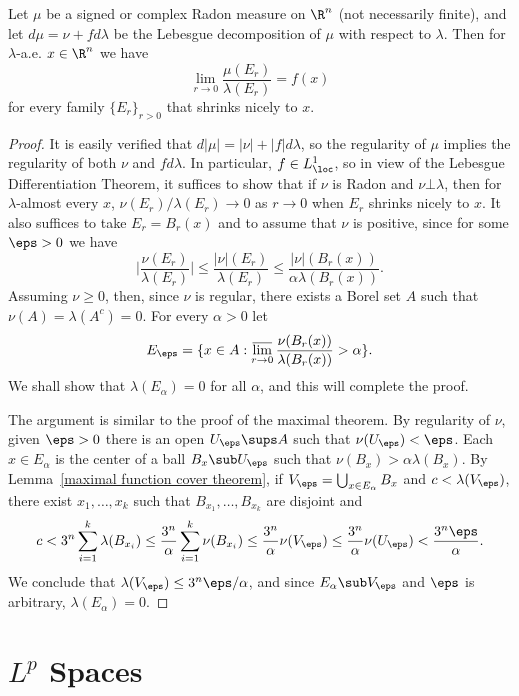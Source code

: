 \begin{theorem}
Let $\mu$ be a signed or complex Radon measure on $\R^n$ (not necessarily finite), and let $d\mu=\nu+fd\lambda$ be the Lebesgue decomposition of $\mu$ with respect to $\lambda$. Then for $\lambda$-a.e. $x\in\R^n$ we have
\[\lim_{r\to 0}\frac{\mu(E_r)}{\lambda(E_r)}=f(x)\]
for every family $\{E_r\}_{r>0}$ that shrinks nicely to $x$.
\end{theorem}
\begin{proof}
It is easily verified that $d|\mu|=|\nu|+|f|d\lambda$, so the regularity of $\mu$ implies the regularity of both $\nu$ and $fd\lambda$. In particular, $f\in L^1_{\loc}$, so in view of the Lebesgue Differentiation Theorem, it suffices to show that if $\nu$ is Radon and $\nu\bot\lambda$, then for $\lambda$-almost every $x$, $\nu(E_r)/\lambda(E_r)\to 0$ as $r\to 0$ when $E_r$ shrinks nicely to $x$. It also suffices to take $E_r=B_r(x)$ and to assume that $\nu$ is positive, since for some $\eps>0$ we have
\[\Big|\frac{\nu(E_r)}{\lambda(E_r)}\Big|\leq\frac{|\nu|(E_r)}{\lambda(E_r)}\leq\frac{|\nu|(B_r(x))}{\alpha\lambda(B_r(x))}.\]
Assuming $\nu\geq 0$, then, since $\nu$ is regular, there exists a Borel set $A$ such that $\nu(A)=\lambda(A^c)=0$. For every $\alpha>0$ let
\[E_\eps=\{x\in A:\varlimsup_{r\to 0}\frac{\nu(B_r(x))}{\lambda(B_r(x))}>\alpha\}.\]
We shall show that $\lambda(E_\alpha)=0$ for all $\alpha$, and this will complete the proof.\par
The argument is similar to the proof of the maximal theorem. By regularity of $\nu$, given $\eps>0$ there is an open $U_\eps\sups A$ such that $\nu(U_\eps)<\eps$. Each $x\in E_\alpha$ is the center of a ball $B_x\sub U_\eps$ such that $\nu(B_x)>\alpha\lambda(B_x)$. By Lemma~\ref{maximal function cover theorem}, if $V_\eps=\bigcup_{x\in E_\alpha}B_x$ and $c<\lambda(V_\eps)$, there exist $x_1,\dots,x_k$ such that $B_{x_1},\dots,B_{x_k}$ are disjoint and
\[c<3^n\sum_{i=1}^{k}\lambda(B_{x_i})\leq\frac{3^n}{\alpha}\sum_{i=1}^{k}\nu(B_{x_i})\leq\frac{3^n}{\alpha}\nu(V_\eps)\leq\frac{3^n}{\alpha}\nu(U_\eps)<\frac{3^n\eps}{\alpha}.\]
We conclude that $\lambda(V_\eps)\leq 3^n\eps/\alpha$, and since $E_\alpha\sub V_\eps$ and $\eps$ is arbitrary, $\lambda(E_\alpha)=0$.
\end{proof}
\newpage
\chapter{\boldmath$L^p$ Spaces}

